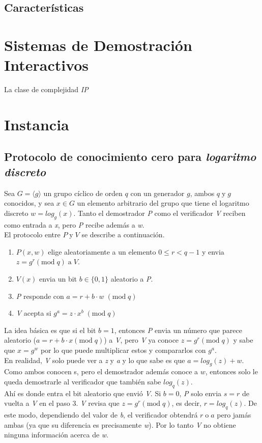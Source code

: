 \documentclass[oneside,10pt]{article}
\begin{document}
\subsection{Características}

\section{Sistemas de Demostración Interactivos}
La clase de complejidad \emph{IP} \cite{arora}


\section{Instancia}
\subsection{Protocolo de conocimiento cero para \emph{logaritmo discreto}}\cite{chris-chan}
Sea $G = \langle g \rangle$ un grupo cíclico de orden $q$ con un generador $g$, ambos $q \; \mathrm{y} \; g$ conocidos, y sea $x \in G$ un elemento arbitrario del grupo que tiene el logaritmo discreto $w = log_g(x)$. Tanto el demostrador \emph{P} como el verificador \emph{V} reciben como entrada a \emph{x}, pero \emph{P} recibe además a \emph{w}.\\
El protocolo entre $P \; \mathrm{y} \; V$ se describe a continuación.
\begin{enumerate}
\item $P(x,w)$ elige aleatoriamente a un elemento $ 0 \leq r < q-1$ y envia $z = g^r (\mathrm{mod}\; q) \; \mathrm{a} \; V$.
\item $V(x)$ envia un bit  $b \in \{0,1\}$ aleatorio a \emph{P}. 
\item \emph{P} responde con $a = r + b \cdot w \;(\mathrm{mod}\; q)$
\item \emph{V} acepta si $g^a = z \cdot x^b \;(\mathrm{mod}\; q)$
\end{enumerate}
La idea básica es que si el bit $b = 1$, entonces \emph{P} envia un número que parece aleatorio ($a = r + b \cdot x (\mathrm{mod}\; q)$) a \emph{V}, pero \emph{V} ya conoce $z = g^r (\mathrm{mod}\; q)$ y sabe que $x = g^w$ por lo que puede multiplicar estos y compararlos con $g^a$. \\
En realidad, \emph{V} solo puede ver a \emph{z} y \emph{a} y lo que sabe es que $a = log_g(z) + w$. Como ambos conocen s, pero el demostrador además conoce a $w$, entonces solo le queda demostrarle al verificador que también sabe $log_q(z)$. \\
Ahí es donde entra el bit aleatorio que envió \emph{V}. Si $b=0$, \emph{P} solo envia $s=r$ de vuelta a \emph{V} en el paso 3. \emph{V} revisa que $z=g^r (\mathrm{mod}\; q)$, es decir, $r = log_q(z)$. De este modo, dependiendo del valor de \emph{b}, el verificador obtendrá $r \; \mathrm{o} \; a$ pero jamás ambas (ya que su diferencia es precisamente \emph{w}). Por lo tanto \emph{V} no obtiene ninguna información acerca de \emph{w}.
\end{document}
